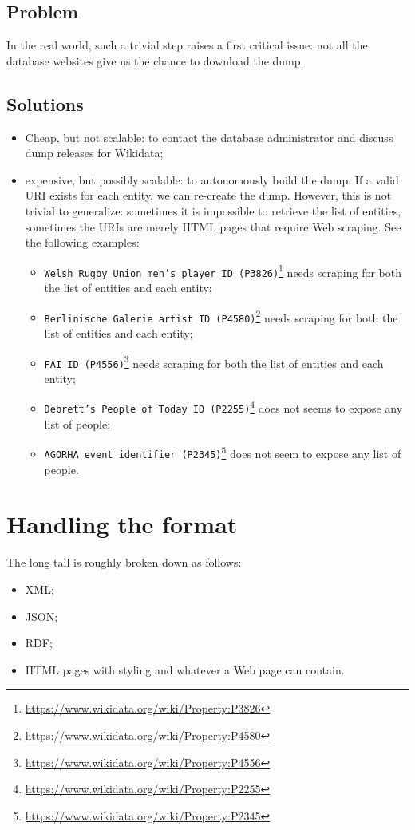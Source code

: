 \subsection{Problem}
\label{cha:211}
In the real world, such a trivial step raises a first critical issue: not all the database websites give us the chance to download the dump.

\subsection{Solutions}
\label{cha:212}
\begin{itemize}
  \item Cheap, but not scalable: to contact the database administrator and discuss dump releases for Wikidata;
  \item expensive, but possibly scalable: to autonomously build the dump. If a valid URI exists for each entity, we can re-create the dump. However, this is not trivial to generalize: sometimes it is impossible to retrieve the list of entities, sometimes the URIs are merely HTML pages that require Web scraping. See the following examples:
  \begin{itemize}
      \item \texttt{Welsh Rugby Union men's player ID (P3826)}\footnote{\url{https://www.wikidata.org/wiki/Property:P3826}} needs scraping for both the list of entities and each entity;
      \item \texttt{Berlinische Galerie artist ID (P4580)}\footnote{\url{https://www.wikidata.org/wiki/Property:P4580}} needs scraping for both the list of entities and each entity;
      \item \texttt{FAI ID (P4556)}\footnote{\url{https://www.wikidata.org/wiki/Property:P4556}} needs scraping for both the list of entities and each entity;
      \item \texttt{Debrett's People of Today ID (P2255)}\footnote{\url{https://www.wikidata.org/wiki/Property:P2255}} does not seems to expose any list of people;
      \item \texttt{AGORHA event identifier (P2345)}\footnote{\url{https://www.wikidata.org/wiki/Property:P2345}} does not seem to expose any list of people.
  \end{itemize}
\end{itemize}

\section{Handling the format}
\label{cha:22}
The long tail is roughly broken down as follows:
\begin{itemize}
    \item XML;
    \item JSON;
    \item RDF;
    \item HTML pages with styling and whatever a Web page can contain.
\end{itemize}

